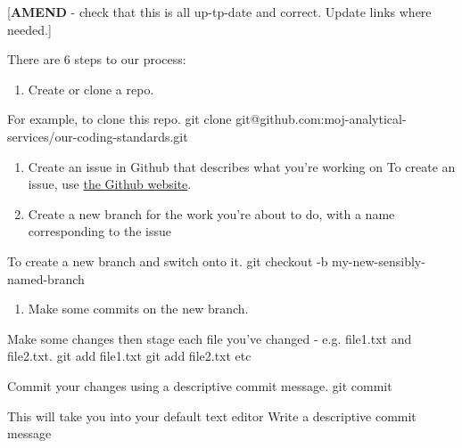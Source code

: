 \documentclass[]{book}
\newenvironment{Shaded}{\begin{snugshade}}{\end{snugshade}}
\newcommand{\ExtensionTok}[1]{#1}
\newcommand{\FunctionTok}[1]{\textcolor[rgb]{0.00,0.00,0.00}{#1}}
\newcommand{\NormalTok}[1]{#1}
\newcommand{\StringTok}[1]{\textcolor[rgb]{0.31,0.60,0.02}{#1}}
\providecommand{\tightlist}{%
  \setlength{\itemsep}{0pt}\setlength{\parskip}{0pt}}
\begin{document}
{[}\textbf{AMEND} - check that this is all up-tp-date and correct. Update links where needed.{]}

There are 6 steps to our process:

\begin{enumerate}
\def\labelenumi{\arabic{enumi}.}
\tightlist
\item
  Create or clone a repo.
\end{enumerate}

\begin{Shaded}
\begin{Highlighting}[]
\ExtensionTok{For}\NormalTok{ example, to clone this repo.}
\FunctionTok{git}\NormalTok{ clone git@github.com:moj-analytical-services/our-coding-standards.git}
\end{Highlighting}
\end{Shaded}

\begin{enumerate}
\def\labelenumi{\arabic{enumi}.}
\setcounter{enumi}{1}
\item
  Create an issue in Github that describes what you're working on
  To create an issue, use \href{https://guides.github.com/features/issues/}{the Github website}.
\item
  Create a new branch for the work you're about to do, with a name corresponding to the issue
\end{enumerate}

\begin{Shaded}
\begin{Highlighting}[]
\ExtensionTok{To}\NormalTok{ create a new branch and switch onto it.}
\FunctionTok{git}\NormalTok{ checkout -b my-new-sensibly-named-branch}
\end{Highlighting}
\end{Shaded}

\begin{enumerate}
\def\labelenumi{\arabic{enumi}.}
\setcounter{enumi}{3}
\tightlist
\item
  Make some commits on the new branch.
\end{enumerate}

\begin{Shaded}
\begin{Highlighting}[]
\ExtensionTok{Make}\NormalTok{ some changes then stage each file you}\StringTok{'ve changed - e.g. file1.txt and file2.txt.}
\StringTok{git add file1.txt}
\StringTok{git add file2.txt}
\StringTok{etc}

\StringTok{Commit your changes using a descriptive commit message.}
\StringTok{git commit}

\StringTok{This will take you into your default text editor}
\StringTok{Write a descriptive commit message}
\end{Highlighting}
\end{Shaded}
\end{document}
